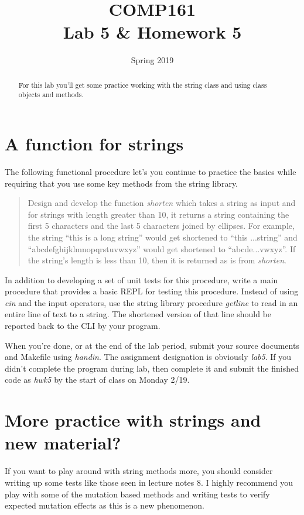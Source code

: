 \documentclass[nobib]{tufte-handout}
\title{COMP161 \\ Lab 5 \& Homework 5}
\author{}
\date{Spring 2019}
\begin{document}
\maketitle

\begin{abstract}
For this lab you'll get some practice working with the string class and using class objects and methods.
\end{abstract}

\section{ A function for strings }

The following functional procedure let's you continue to practice the basics while requiring that you use some key methods from the string library.
\begin{quote}
Design and develop the function \textit{shorten} which takes a string as input and for strings with length greater than 10, it returns a string containing the first 5 characters and the last 5 characters joined by ellipses. For example, the string ``this is a long string'' would get shortened to ``this ...string'' and ``abcdefghijklmnopqrstuvwxyz'' would get shortened to ``abcde...vwxyz''. If the string's length is less than 10, then it is returned as is from \textit{shorten}.
\end{quote}
In addition to developing a set of unit tests for this procedure, write a main procedure that provides a basic REPL for testing this procedure. Instead of using \textit{cin} and the input operators, use the string library procedure \textit{getline} to read in an entire line of text to a string. The shortened version of that line should be reported back to the CLI by your program.

When you're done, or at the end of the lab period, submit your source documents and Makefile using \textit{handin}. The assignment designation is obviously \textit{lab5}. If you didn't complete the program during lab, then complete it and submit the finished code as \textit{hwk5} by the start of class on Monday 2/19.

\section{ More practice with strings and new material? }

If you want to play around with string methods more, you should consider writing up some tests like those seen in lecture notes 8. I highly recommend you play with some of the mutation based methods and writing tests to verify expected mutation effects as this is a new phenomenon.
\end{document}
